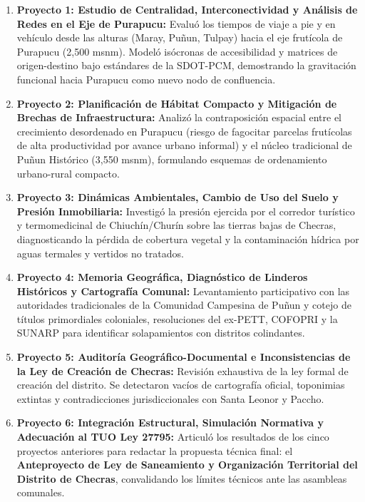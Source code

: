 \documentclass[11pt,a4paper]{article}
\begin{document}
\begin{enumerate}[leftmargin=*]
    \item \textbf{Proyecto 1: Estudio de Centralidad, Interconectividad y Análisis de Redes en el Eje de Purapucu:}
    Evaluó los tiempos de viaje a pie y en vehículo desde las alturas (Maray, Puñun, Tulpay) hacia el eje frutícola de Purapucu (2,500 msnm). Modeló isócronas de accesibilidad y matrices de origen-destino bajo estándares de la SDOT-PCM, demostrando la gravitación funcional hacia Purapucu como nuevo nodo de confluencia.
    
    \item \textbf{Proyecto 2: Planificación de Hábitat Compacto y Mitigación de Brechas de Infraestructura:}
    Analizó la contraposición espacial entre el crecimiento desordenado en Purapucu (riesgo de fagocitar parcelas frutícolas de alta productividad por avance urbano informal) y el núcleo tradicional de Puñun Histórico (3,550 msnm), formulando esquemas de ordenamiento urbano-rural compacto.
    
    \item \textbf{Proyecto 3: Dinámicas Ambientales, Cambio de Uso del Suelo y Presión Inmobiliaria:}
    Investigó la presión ejercida por el corredor turístico y termomedicinal de Chiuchín/Churín sobre las tierras bajas de Checras, diagnosticando la pérdida de cobertura vegetal y la contaminación hídrica por aguas termales y vertidos no tratados.
    
    \item \textbf{Proyecto 4: Memoria Geográfica, Diagnóstico de Linderos Históricos y Cartografía Comunal:}
    Levantamiento participativo con las autoridades tradicionales de la Comunidad Campesina de Puñun y cotejo de títulos primordiales coloniales, resoluciones del ex-PETT, COFOPRI y la SUNARP para identificar solapamientos con distritos colindantes.
    
    \item \textbf{Proyecto 5: Auditoría Geográfico-Documental e Inconsistencias de la Ley de Creación de Checras:}
    Revisión exhaustiva de la ley formal de creación del distrito. Se detectaron vacíos de cartografía oficial, toponimias extintas y contradicciones jurisdiccionales con Santa Leonor y Paccho.
    
    \item \textbf{Proyecto 6: Integración Estructural, Simulación Normativa y Adecuación al TUO Ley 27795:}
    Articuló los resultados de los cinco proyectos anteriores para redactar la propuesta técnica final: el \textbf{Anteproyecto de Ley de Saneamiento y Organización Territorial del Distrito de Checras}, convalidando los límites técnicos ante las asambleas comunales.
\end{enumerate}
\end{document}
